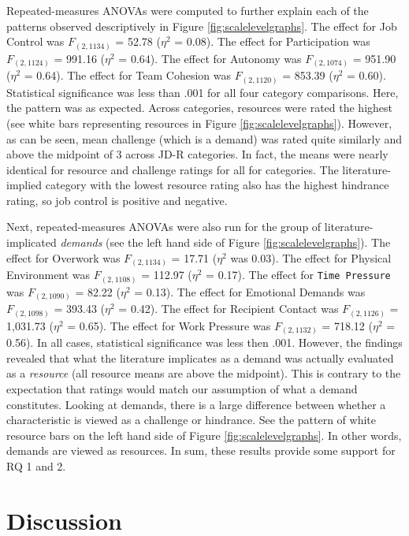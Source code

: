 \documentclass[
  man,mask]{apa7}
\begin{document}
Repeated-measures ANOVAs were computed to further explain each of the patterns observed descriptively in Figure \ref{fig:scalelevelgraphs}. The effect for Job Control was \(F_{(2, 1134)}\) = 52.78 (\(\eta^2\) = 0.08).
The effect for Participation was \(F_{(2, 1124)}\) = 991.16 (\(\eta^2\) = 0.64).
The effect for Autonomy was \(F_{(2, 1074)}\) = 951.90 (\(\eta^2\) = 0.64).
The effect for Team Cohesion was \(F_{(2, 1120)}\) = 853.39 (\(\eta^2\) = 0.60). Statistical significance was less than .001 for all four category comparisons. Here, the pattern was as expected. Across categories, resources were rated the highest (see white bars representing resources in Figure \ref{fig:scalelevelgraphs}). However, as can be seen, mean challenge (which is a demand) was rated quite similarly and above the midpoint of 3 across JD-R categories. In fact, the means were nearly identical for resource and challenge ratings for all for categories. The literature-implied category with the lowest resource rating also has the highest hindrance rating, so job control is positive and negative.

Next, repeated-measures ANOVAs were also run for the group of literature-implicated \emph{demands} (see the left hand side of Figure \ref{fig:scalelevelgraphs}). The effect for Overwork was \(F_{(2, 1134)}\) = 17.71 (\(\eta^2\) was 0.03). The effect for Physical Environment was \(F_{(2, 1108)}\) = 112.97 (\(\eta^2\) = 0.17). The effect for \texttt{Time\ Pressure} was \(F_{(2, 1090)}\) = 82.22 (\(\eta^2\) = 0.13). The effect for Emotional Demands was \(F_{(2, 1098)}\) = 393.43 (\(\eta^2\) = 0.42).
The effect for Recipient Contact was \(F_{(2, 1126)}\) = 1,031.73 (\(\eta^2\) = 0.65). The effect for Work Pressure was \(F_{(2, 1132)}\) = 718.12 (\(\eta^2\) = 0.56). In all cases, statistical significance was less then .001. However, the findings revealed that what the literature implicates as a demand was actually evaluated as a \emph{resource} (all resource means are above the midpoint). This is contrary to the expectation that ratings would match our assumption of what a demand constitutes. Looking at demands, there is a large difference between whether a characteristic is viewed as a challenge or hindrance. See the pattern of white resource bars on the left hand side of Figure \ref{fig:scalelevelgraphs}. In other words, demands are viewed as resources. In sum, these results provide some support for RQ 1 and 2.

\hypertarget{discussion}{%
\section{Discussion}\label{discussion}}
\end{document}
